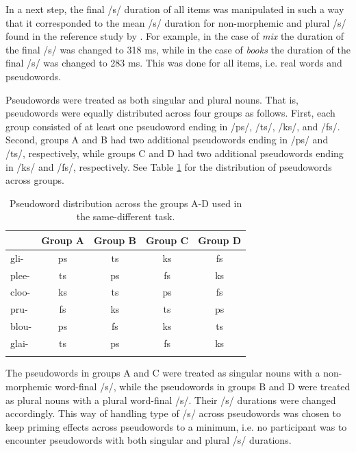 In a next step, the final /s/ duration of all items was manipulated in such a way that it corresponded to the mean /s/ duration for non-morphemic and plural /s/ found in the reference study by \citet{Plag2017}. For example, in the case of \textit{mix} the duration of the final /s/ was changed to 318 ms, while in the case of \textit{books} the duration of the final /s/ was changed to 283 ms. This was done for all items, i.e. real words and pseudowords. 

Pseudowords were treated as both singular and plural nouns. That is, pseudowords were equally distributed across four groups as follows. First, each group consisted of at least one pseudoword ending in /ps/, /ts/, /ks/, and /fs/. Second, groups A and B had two additional pseudowords ending in /ps/ and /ts/, respectively, while groups C and D had two additional pseudowords ending in /ks/ and /fs/, respectively. See Table \ref{tab:6.5} for the distribution of pseudowords across groups. 

\begin{table}\fontsize{10}{11}
\caption{Pseudoword distribution across the groups A-D used in the same-different task.}
\label{tab:6.5}
\centering
\begin{tabular}{lcccc} 
\lsptoprule
~     & Group A & Group B & Group C & Group D  \\ 
\midrule
gli-  & ps      & ts      & ks      & fs       \\
plee- & ts      & ps      & fs      & ks       \\
cloo- & ks      & ts      & ps      & fs       \\
pru-  & fs      & ks      & ts      & ps       \\
blou- & ps      & fs      & ks      & ts       \\
glai- & ts      & ps      & fs      & ks       \\
\lspbottomrule
\end{tabular}
\end{table}

The pseudowords in groups A and C were treated as singular nouns with a non-morphemic word-final /s/, while the pseudowords in groups B and D were treated as plural nouns with a plural word-final /s/. Their /s/ durations were changed accordingly. This way of handling type of /s/ across pseudowords was chosen to keep priming effects across pseudowords to a minimum, i.e. no participant was to encounter pseudowords with both singular and plural /s/ durations. 

